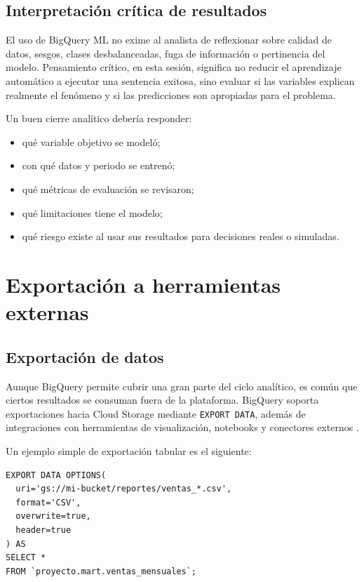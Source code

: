 \documentclass[12pt]{article}
\begin{document}
\subsection{Interpretación crítica de resultados}
El uso de BigQuery ML no exime al analista de reflexionar sobre calidad de datos, sesgos, clases desbalanceadas, fuga de información o pertinencia del modelo. Pensamiento crítico, en esta sesión, significa no reducir el aprendizaje automático a ejecutar una sentencia exitosa, sino evaluar si las variables explican realmente el fenómeno y si las predicciones son apropiadas para el problema.

Un buen cierre analítico debería responder:

\begin{itemize}[leftmargin=*]
\item qué variable objetivo se modeló;
\item con qué datos y periodo se entrenó;
\item qué métricas de evaluación se revisaron;
\item qué limitaciones tiene el modelo;
\item qué riesgo existe al usar sus resultados para decisiones reales o simuladas.
\end{itemize}

\section{Exportación a herramientas externas}
\subsection{Exportación de datos}
Aunque BigQuery permite cubrir una gran parte del ciclo analítico, es común que ciertos resultados se consuman fuera de la plataforma. BigQuery soporta exportaciones hacia Cloud Storage mediante \texttt{EXPORT DATA}, además de integraciones con herramientas de visualización, notebooks y conectores externos \cite{gcp_export_data}.

Un ejemplo simple de exportación tabular es el siguiente:

\begin{lstlisting}[style=sql, caption={Exportación de resultados a Cloud Storage}]
EXPORT DATA OPTIONS(
  uri='gs://mi-bucket/reportes/ventas_*.csv',
  format='CSV',
  overwrite=true,
  header=true
) AS
SELECT *
FROM `proyecto.mart.ventas_mensuales`;
\end{lstlisting}
\end{document}
